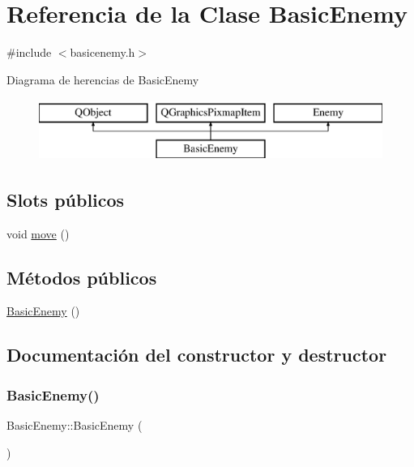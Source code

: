 \hypertarget{class_basic_enemy}{}\section{Referencia de la Clase Basic\+Enemy}
\label{class_basic_enemy}


{\ttfamily \#include $<$basicenemy.\+h$>$}

Diagrama de herencias de Basic\+Enemy\begin{figure}[H]
\begin{center}
\leavevmode
\includegraphics[height=2.000000cm]{class_basic_enemy}
\end{center}
\end{figure}
\subsection*{Slots públicos}
\begin{DoxyCompactItemize}
\item 
void \hyperlink{class_basic_enemy_ad491ec5aa0aee2b51399181f5e8259db}{move} ()
\end{DoxyCompactItemize}
\subsection*{Métodos públicos}
\begin{DoxyCompactItemize}
\item 
\hyperlink{class_basic_enemy_a1e97e4012172888af93dc1286dc4ade0}{Basic\+Enemy} ()
\end{DoxyCompactItemize}


\subsection{Documentación del constructor y destructor}
\hypertarget{class_basic_enemy_a1e97e4012172888af93dc1286dc4ade0}{}\label{class_basic_enemy_a1e97e4012172888af93dc1286dc4ade0} 
\subsubsection{\texorpdfstring{Basic\+Enemy()}{BasicEnemy()}}
{\footnotesize\ttfamily Basic\+Enemy\+::\+Basic\+Enemy (\begin{DoxyParamCaption}{ }\end{DoxyParamCaption})}



